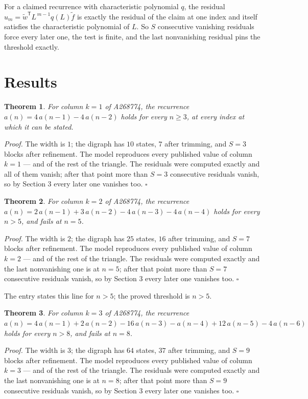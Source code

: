 \documentclass[11pt]{article}
\newtheorem{theorem}{Theorem}
\theoremstyle{definition}
\begin{document}
For a claimed recurrence with characteristic polynomial $q$, the residual $u_m = \tilde w^{\mathsf T}L^{\,m-1}q(L)\tilde f$ is exactly the residual of the claim at one index and itself satisfies the characteristic polynomial of $L$. So $S$ consecutive vanishing residuals force every later one, the test is finite, and the last nonvanishing residual pins the threshold exactly.

\section{Results}

\begin{theorem} For column $k = 1$ of A268774, the recurrence $a(n) = 4\,a(n-1) - 4\,a(n-2)$ holds for every $n \ge 3$, at every index at which it can be stated.\end{theorem}

{\itshape Proof.} The width is $1$; the digraph has $10$ states, $7$ after trimming, and $S = 3$ blocks after refinement. The model reproduces every published value of column $k = 1$ --- and of the rest of the triangle. The residuals were computed exactly and all of them vanish; after that point more than $S = 3$ consecutive residuals vanish, so by Section 3 every later one vanishes too. $\square$

\begin{theorem} For column $k = 2$ of A268774, the recurrence $a(n) = 2\,a(n-1) + 3\,a(n-2) - 4\,a(n-3) - 4\,a(n-4)$ holds for every $n > 5$, and fails at $n = 5$.\end{theorem}

{\itshape Proof.} The width is $2$; the digraph has $25$ states, $16$ after trimming, and $S = 7$ blocks after refinement. The model reproduces every published value of column $k = 2$ --- and of the rest of the triangle. The residuals were computed exactly and the last nonvanishing one is at $n = 5$; after that point more than $S = 7$ consecutive residuals vanish, so by Section 3 every later one vanishes too. $\square$

The entry states this line for $n > 5$; the proved threshold is $n > 5$.

\begin{theorem} For column $k = 3$ of A268774, the recurrence $a(n) = 4\,a(n-1) + 2\,a(n-2) - 16\,a(n-3) - a(n-4) + 12\,a(n-5) - 4\,a(n-6)$ holds for every $n > 8$, and fails at $n = 8$.\end{theorem}

{\itshape Proof.} The width is $3$; the digraph has $64$ states, $37$ after trimming, and $S = 9$ blocks after refinement. The model reproduces every published value of column $k = 3$ --- and of the rest of the triangle. The residuals were computed exactly and the last nonvanishing one is at $n = 8$; after that point more than $S = 9$ consecutive residuals vanish, so by Section 3 every later one vanishes too. $\square$
\end{document}
